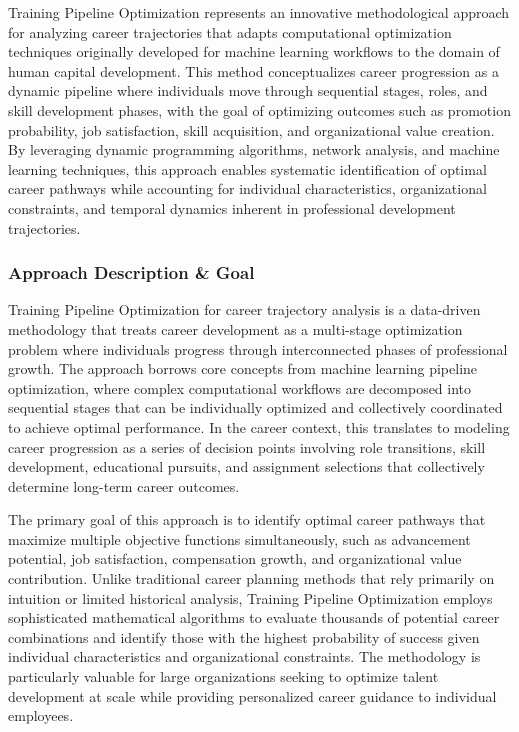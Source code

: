 \documentclass[main.tex]{subfiles}
\begin{document}
Training Pipeline Optimization represents an innovative methodological approach for analyzing career trajectories that adapts computational optimization techniques originally developed for machine learning workflows to the domain of human capital development. This method conceptualizes career progression as a dynamic pipeline where individuals move through sequential stages, roles, and skill development phases, with the goal of optimizing outcomes such as promotion probability, job satisfaction, skill acquisition, and organizational value creation\parencite{career_optimization,jobcomposer}. By leveraging dynamic programming algorithms, network analysis, and machine learning techniques, this approach enables systematic identification of optimal career pathways while accounting for individual characteristics, organizational constraints, and temporal dynamics inherent in professional development trajectories\parencite{dynapipe_eurosys,dynapipe_amazon}.

\subsubsection{Approach Description \& Goal}

Training Pipeline Optimization for career trajectory analysis is a data-driven methodology that treats career development as a multi-stage optimization problem where individuals progress through interconnected phases of professional growth\parencite{career_optimization}. The approach borrows core concepts from machine learning pipeline optimization, where complex computational workflows are decomposed into sequential stages that can be individually optimized and collectively coordinated to achieve optimal performance\parencite{superannotate_ml,talent_pipelines}. In the career context, this translates to modeling career progression as a series of decision points involving role transitions, skill development, educational pursuits, and assignment selections that collectively determine long-term career outcomes\parencite{jobcomposer}.

The primary goal of this approach is to identify optimal career pathways that maximize multiple objective functions simultaneously, such as advancement potential, job satisfaction, compensation growth, and organizational value contribution\parencite{jobcomposer,career_optimization}. Unlike traditional career planning methods that rely primarily on intuition or limited historical analysis, Training Pipeline Optimization employs sophisticated mathematical algorithms to evaluate thousands of potential career combinations and identify those with the highest probability of success given individual characteristics and organizational constraints\parencite{career_optimization}. The methodology is particularly valuable for large organizations seeking to optimize talent development at scale while providing personalized career guidance to individual employees\parencite{succession_pipelines}.
\end{document}
